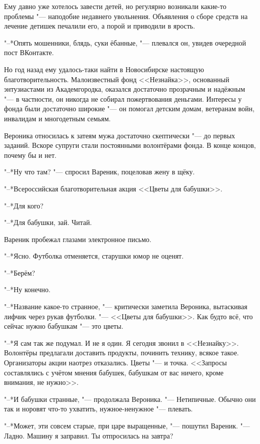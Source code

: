 Ему давно уже хотелось завести детей, но регулярно возникали какие-то проблемы "--- наподобие недавнего увольнения.
Объявления о сборе средств на лечение детишек печалили его, а порой и приводили в ярость.

"--*Опять мошенники, блядь, суки ёбанные, "--- плевался он, увидев очередной пост ВКонтакте.

Но год назад ему удалось-таки найти в Новосибирске настоящую благотворительность.
Малоизвестный фонд <<Незнайка>>, основанный энтузиастами из Академгородка, оказался достаточно прозрачным и надёжным "--- в частности, он никогда не собирал пожертвования деньгами.
Интересы у фонда были достаточно широкие "--- он помогал детским домам, ветеранам войн, инвалидам и многодетным семьям.

Вероника относилась к затеям мужа достаточно скептически "--- до первых заданий.
Вскоре супруги стали постоянными волонтёрами фонда.
В конце концов, почему бы и нет.

"--*Ну что там? "--- спросил Вареник, поцеловав жену в щёку.

"--*Всероссийская благотворительная акция <<Цветы для бабушки>>.

"--*Для кого?

"--*Для бабушки, зай.
Читай.

Вареник пробежал глазами электронное письмо.

"--*Ясно.
Футболка отменяется, старушки юмор не оценят.

"--*Берём?

"--*Ну конечно.

\asterism

\textspace

"--*Название какое-то странное, "--- критически заметила Вероника, вытаскивая лифчик через рукав футболки.
"--- <<Цветы для бабушки>>.
Как будто всё, что сейчас нужно бабушкам "--- это цветы.

"--*Я сам так же подумал.
И не я один.
Я сегодня звонил в <<Незнайку>>.
Волонтёры предлагали доставить продукты, починить технику, всякое такое.
Организаторы акции наотрез отказались.
Цветы "--- и точка.
<<Запросы составлялись с учётом мнения бабушек, бабушкам от вас ничего, кроме внимания, не нужно>>.

"--*И бабушки странные, "--- продолжала Вероника.
"--- Нетипичные.
Обычно они так и норовят что-то ухватить, нужное-ненужное "--- плевать.

"--*Может, эти совсем старые, при царе выращенные, "--- пошутил Вареник.
"--- Ладно.
Машину я заправил.
Ты отпросилась на завтра?

